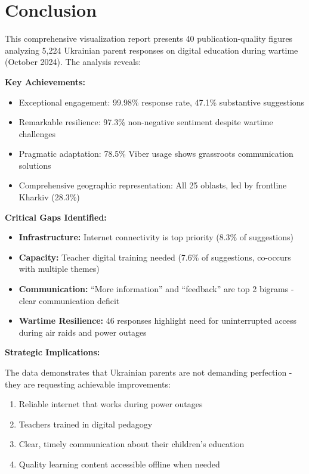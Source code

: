\documentclass[11pt,a4paper]{article}
\begin{document}
\newpage

\section{Conclusion}

This comprehensive visualization report presents 40 publication-quality figures analyzing 5,224 Ukrainian parent responses on digital education during wartime (October 2024). The analysis reveals:

\textbf{Key Achievements:}
\begin{itemize}
    \item Exceptional engagement: 99.98\% response rate, 47.1\% substantive suggestions
    \item Remarkable resilience: 97.3\% non-negative sentiment despite wartime challenges
    \item Pragmatic adaptation: 78.5\% Viber usage shows grassroots communication solutions
    \item Comprehensive geographic representation: All 25 oblasts, led by frontline Kharkiv (28.3\%)
\end{itemize}

\textbf{Critical Gaps Identified:}
\begin{itemize}
    \item \textbf{Infrastructure:} Internet connectivity is top priority (8.3\% of suggestions)
    \item \textbf{Capacity:} Teacher digital training needed (7.6\% of suggestions, co-occurs with multiple themes)
    \item \textbf{Communication:} ``More information'' and ``feedback'' are top 2 bigrams - clear communication deficit
    \item \textbf{Wartime Resilience:} 46 responses highlight need for uninterrupted access during air raids and power outages
\end{itemize}

\textbf{Strategic Implications:}

The data demonstrates that Ukrainian parents are not demanding perfection - they are requesting achievable improvements:
\begin{enumerate}
    \item Reliable internet that works during power outages
    \item Teachers trained in digital pedagogy
    \item Clear, timely communication about their children's education
    \item Quality learning content accessible offline when needed
\end{enumerate}
\end{document}
